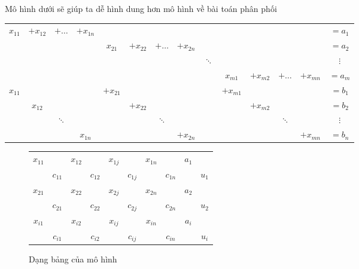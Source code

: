 \documentclass{article}
\begin{document}
\begin{enumerate}
        Mô hình dưới sẽ giúp ta dễ hình dung hơn mô hình về bài toán phân phối
                    \begin{flushleft}
                        \setlength{\tabcolsep}{1pt}
                        \begin{tabular} { cccccccccccccc }
                            $x_{11}$ & $+x_{12}$ & $+ \ldots $ &$+ x_{1n}$ &&&&&&&&&& $= a_1$ \\
                            &&&& $x_{21}$ & $+x_{22}$ & $+ \ldots $ &$+ x_{2n}$ &&&&&& $= a_2$ \\
                            &&&&&&&& $\ddots$ &&&&& $\vdots$ \\
                            &&&&&&&&& $x_{m1}$ & $+x_{m2}$ & $+ \ldots $ &$+ x_{mn}$ & $= a_m$ \\
                            $x_{11}$ &&&& $+x_{21}$ &&&&& $+x_{m1}$ &&&& $= b_1$ \\
                            & $x_{12}$ &&&& $+x_{22}$ &&&&& $+x_{m2}$ &&& $= b_2$ \\
                            && $\ddots$ &&&& $\ddots$ &&&&& $\ddots$ && $\vdots$ \\
                            &&& $x_{1n}$ &&&& $+x_{2n}$ &&&&& $+x_{mn}$ & $= b_n$ \\
                        \end{tabular}
                    \end{flushleft}
                    \begin{figure}
                        \caption{Dạng bảng của mô hình}
                    \begin{center}
                        \begin{tabular} { |cc|cc|cc|cc|cc| }
                            \hline
                            $x_{11}$ && $x_{12}$ && $x_{1j}$ && $x_{1n}$ && $a_1$ & \\
                            & $c_{11}$ && $c_{12}$ && $c_{1j}$ && $c_{1n}$ && $u_1$ \\
                            \hline
                            $x_{21}$ && $x_{22}$ && $x_{2j}$ && $x_{2n}$ && $a_2$ & \\
                            & $c_{21}$ && $c_{22}$ && $c_{2j}$ && $c_{2n}$ && $u_2$ \\
                            \hline
                            $x_{i1}$ && $x_{i2}$ && $x_{ij}$ && $x_{in}$ && $a_i$ & \\
                            & $c_{i1}$ && $c_{i2}$ && $c_{ij}$ && $c_{in}$ && $u_i$ \\

\end{tabular}
\end{center}
\end{figure}
\end{enumerate}
\end{document}
